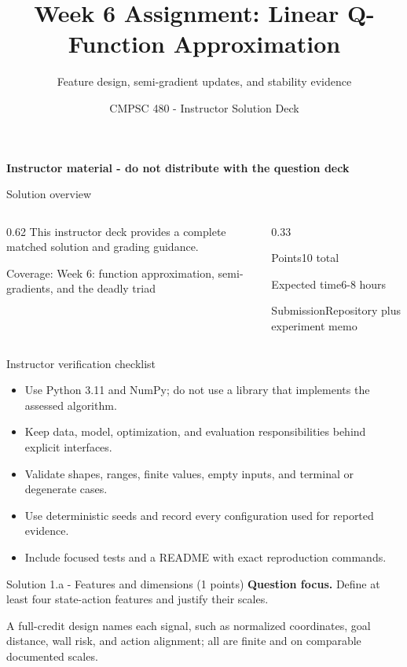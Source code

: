 \documentclass[aspectratio=169,11pt]{beamer}
\title[Week 6 Assignment Solutions]{Week 6 Assignment: Linear Q-Function Approximation}
\subtitle{Feature design, semi-gradient updates, and stability evidence}
\author{CMPSC 480 - Instructor Solution Deck}
\date{}
\begin{document}
\begin{frame}
  \titlepage
\vspace{-0.35cm}
\begin{center}
\color{coursered}\bfseries Instructor material - do not distribute with the question deck
\end{center}
\end{frame}

\begin{frame}{Solution overview}
\begin{columns}[T,onlytextwidth]
\begin{column}{0.62\textwidth}
\Large This instructor deck provides a complete matched solution and grading guidance.

\vspace{0.35cm}
\normalsize
Coverage: Week 6: function approximation, semi-gradients, and the deadly triad
\end{column}
\begin{column}{0.33\textwidth}
\begin{block}{Points}10 total\end{block}
\begin{block}{Expected time}6-8 hours\end{block}
\begin{block}{Submission}Repository plus experiment memo\end{block}
\end{column}
\end{columns}
\end{frame}

\begin{frame}{Instructor verification checklist}
\small
\begin{itemize}
  \item Use Python 3.11 and NumPy; do not use a library that implements the assessed algorithm.
  \item Keep data, model, optimization, and evaluation responsibilities behind explicit interfaces.
  \item Validate shapes, ranges, finite values, empty inputs, and terminal or degenerate cases.
  \item Use deterministic seeds and record every configuration used for reported evidence.
  \item Include focused tests and a README with exact reproduction commands.
\end{itemize}
\end{frame}

\begin{frame}{Solution 1.a - Features and dimensions (1 points)}
\small
\textbf{Question focus.} Define at least four state-action features and justify their scales.

\vspace{0.25cm}
\answerlabel A full-credit design names each signal, such as normalized coordinates, goal distance, wall risk, and action alignment; all are finite and on comparable documented scales.
\end{frame}
\end{document}
